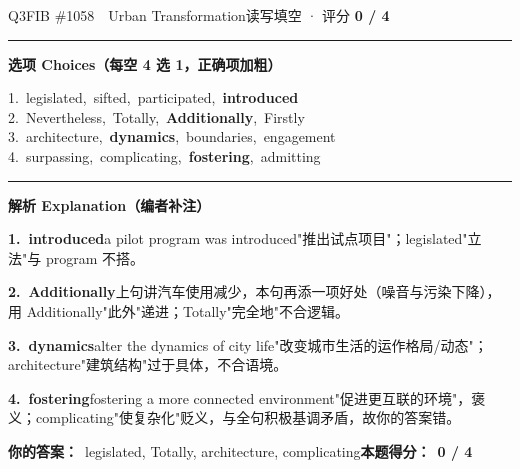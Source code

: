 \documentclass[11pt]{article}
\newcommand{\ptesub}[1]{%
  \par\needspace{2\baselineskip}\smallskip
  {\color{cAccent}\rule[-0.2ex]{3pt}{1.05em}}\hspace{6pt}%
  {\bfseries\color{cHead}#1}\par\nopagebreak\smallskip}
\begin{document}
\begin{qblock}{Q3\quad FIB \#1058\ \ Urban Transformation}{读写填空 · 评分 \textcolor{cAccent}{\bfseries 0 / 4}}
\ptesub{选项 Choices（每空 4 选 1，正确项加粗）}
{\small
1.\ legislated,\ sifted,\ participated,\ \textbf{introduced}\\
2.\ Nevertheless,\ Totally,\ \textbf{Additionally},\ Firstly\\
3.\ architecture,\ \textbf{dynamics},\ boundaries,\ engagement\\
4.\ surpassing,\ complicating,\ \textbf{fostering},\ admitting}
\ptesub{解析 Explanation（编者补注）}
\begin{notebox}\footnotesize
\textbf{1.\ introduced}\quad a pilot program was introduced"推出试点项目"；legislated"立法"与 program 不搭。\par\smallskip
\textbf{2.\ Additionally}\quad 上句讲汽车使用减少，本句再添一项好处（噪音与污染下降），用 Additionally"此外"递进；Totally"完全地"不合逻辑。\par\smallskip
\textbf{3.\ dynamics}\quad alter the dynamics of city life"改变城市生活的运作格局/动态"；architecture"建筑结构"过于具体，不合语境。\par\smallskip
\textbf{4.\ fostering}\quad fostering a more connected environment"促进更互联的环境"，褒义；complicating"使复杂化"贬义，与全句积极基调矛盾，故你的答案错。
\end{notebox}
\smallskip
\textbf{你的答案：}\ {\color{cWrong}legislated, Totally, architecture, complicating}\qquad\textbf{本题得分：}\ {\color{cAccent}\bfseries 0 / 4}
\end{qblock}
\end{document}
